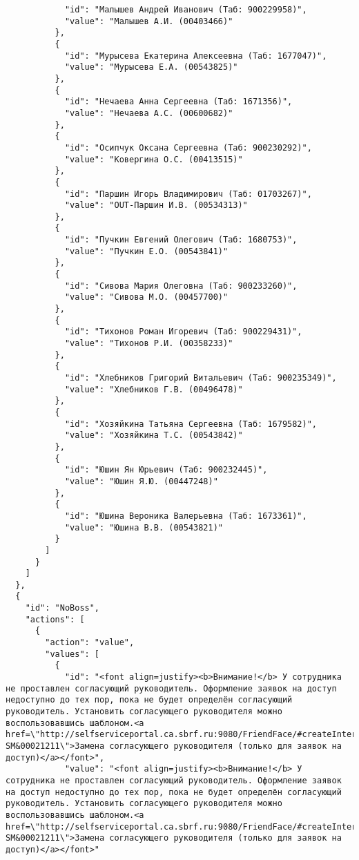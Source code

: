 \documentclass[../index.tex]{subfiles}
\begin{document}
\begin{verbatim}
            "id": "Малышев Андрей Иванович (Таб: 900229958)",
            "value": "Малышев А.И. (00403466)"
          },
          {
            "id": "Мурысева Екатерина Алексеевна (Таб: 1677047)",
            "value": "Мурысева Е.А. (00543825)"
          },
          {
            "id": "Нечаева Анна Сергеевна (Таб: 1671356)",
            "value": "Нечаева А.С. (00600682)"
          },
          {
            "id": "Осипчук Оксана Сергеевна (Таб: 900230292)",
            "value": "Ковергина О.С. (00413515)"
          },
          {
            "id": "Паршин Игорь Владимирович (Таб: 01703267)",
            "value": "OUT-Паршин И.В. (00534313)"
          },
          {
            "id": "Пучкин Евгений Олегович (Таб: 1680753)",
            "value": "Пучкин Е.О. (00543841)"
          },
          {
            "id": "Сивова Мария Олеговна (Таб: 900233260)",
            "value": "Сивова М.О. (00457700)"
          },
          {
            "id": "Тихонов Роман Игоревич (Таб: 900229431)",
            "value": "Тихонов Р.И. (00358233)"
          },
          {
            "id": "Хлебников Григорий Витальевич (Таб: 900235349)",
            "value": "Хлебников Г.В. (00496478)"
          },
          {
            "id": "Хозяйкина Татьяна Сергеевна (Таб: 1679582)",
            "value": "Хозяйкина Т.С. (00543842)"
          },
          {
            "id": "Юшин Ян Юрьевич (Таб: 900232445)",
            "value": "Юшин Я.Ю. (00447248)"
          },
          {
            "id": "Юшина Вероника Валерьевна (Таб: 1673361)",
            "value": "Юшина В.В. (00543821)"
          }
        ]
      }
    ]
  },
  {
    "id": "NoBoss",
    "actions": [
      {
        "action": "value",
        "values": [
          {
            "id": "<font align=justify><b>Внимание!</b> У сотрудника не проставлен согласующий руководитель. Оформление заявок на доступ недоступно до тех пор, пока не будет определён согласующий руководитель. Установить согласующего руководителя можно воспользовавшись шаблоном.<a href=\"http://selfserviceportal.ca.sbrf.ru:9080/FriendFace/#createInteraction?SM&00021211\">Замена согласующего руководителя (только для заявок на доступ)</a></font>",
            "value": "<font align=justify><b>Внимание!</b> У сотрудника не проставлен согласующий руководитель. Оформление заявок на доступ недоступно до тех пор, пока не будет определён согласующий руководитель. Установить согласующего руководителя можно воспользовавшись шаблоном.<a href=\"http://selfserviceportal.ca.sbrf.ru:9080/FriendFace/#createInteraction?SM&00021211\">Замена согласующего руководителя (только для заявок на доступ)</a></font>"

\end{verbatim}
\end{document}
